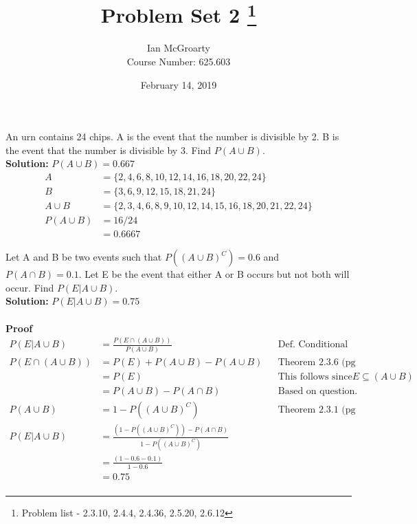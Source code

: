\documentclass[12pt]{article}
\title{Problem Set 2 \thanks{Problem list - 2.3.10, 2.4.4, 2.4.36, 2.5.20, 2.6.12}}
\author{Ian McGroarty \\
	Course Number: 625.603}
\date{February 14, 2019}
\newenvironment{problem}[2][Problem]{\begin{trivlist}
\item[\hskip \labelsep {\bfseries #1}\hskip \labelsep {\bfseries #2.}]}{\end{trivlist}}
\begin{document}
\maketitle

\begin{problem}{2.3.10}  An urn contains 24 chips. A is the event that the number is divisible by 2. B is the event that the number is divisible by 3. Find $P(A\cup B) $. \\
\textbf{Solution:} $P(A \cup B) = 0.667 $
\begin{align*}
A &= \{2,4,6,8,10,12,14,16,18,20,22,24\} \\
B &= \{3,6,9,12,15,18,21,24\} \\
A \cup B &= \{2,3,4,6,8,9,10,12,14,15,16,18,20,21,22,24\} \\
P(A \cup B) &= 16/24 \\
			&= 0.6667
\end{align*}
\end{problem}

\begin{problem}{2.4.4} Let A and B be two events such that $P((A \cup B)^C)=0.6$ and $P(A \cap B) = 0.1$. Let E be the event that either A or B occurs but not both will occur. Find $P(E|A\cup B)$. \\ 
\textbf{Solution:} $P(E|A \cup B) = 0.75$ \\
\\
\textbf{Proof} 
\begin{align*} 
P(E|A \cup B) &= \frac{P(E \cap (A \cup B))}{P(A \cup B)} && \text{Def. Conditional Probability (pg 33)}\\
P(E \cap (A \cup B)) &= P(E) + P(A \cup B) - P(A \cup B)  && \text{Theorem 2.3.6 (pg 27)} \\
 &= P(E) &&\text{This follows since} E \subseteq (A \cup B)\\
 &= P(A \cup B ) - P(A \cap B) && \text{Based on question.} \\
P(A \cup B) &= 1 - P((A \cup B)^C) && \text{Theorem 2.3.1 (pg 27)} \\
P(E|A \cup B) &= \frac{( 1 - P((A \cup B)^C)  ) - P(A \cap B)}{1-P((A \cup B)^C)} \\
	&= \frac{(1-0.6 - 0.1)}{1-0.6} \\
	&= 0.75  \\
\end{align*}
\end{problem}
\end{document}
